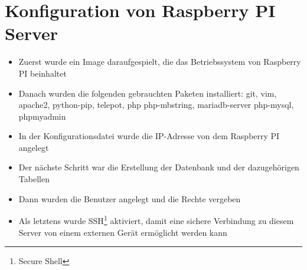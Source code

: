 \section{Konfiguration von Raspberry PI Server}
\begin{itemize}
	\item Zuerst wurde ein Image daraufgespielt, die das Betriebssystem von Raspberry PI beinhaltet
\end{itemize}
\begin{itemize}
	\item Danach wurden die folgenden gebrauchten Paketen installiert: git, vim, apache2, python-pip, telepot, php php-mbstring, mariadb-server php-mysql, phpmyadmin
\end{itemize}
\begin{itemize}
	\item In der Konfigurationsdatei wurde die IP-Adresse von dem Raspberry PI angelegt
\end{itemize}
\begin{itemize}
	\item Der nächste Schritt war die Erstellung der Datenbank und der dazugehörigen Tabellen
\end{itemize}
\begin{itemize}
	\item Dann wurden die Benutzer angelegt und die Rechte vergeben
\end{itemize}
\begin{itemize}
	\item Als letztens wurde SSH\footnote{Secure Shell} aktiviert, damit eine sichere Verbindung zu diesem Server von einem externen Gerät ermöglicht werden kann
\end{itemize}
